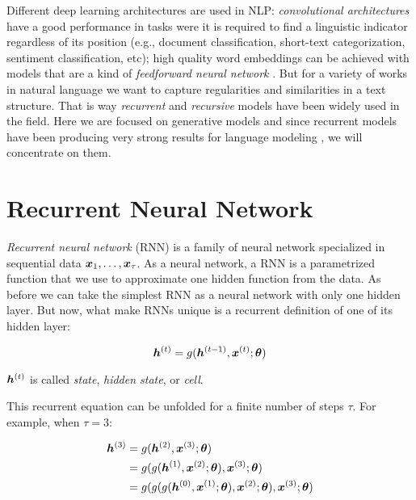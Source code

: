 Different deep learning architectures are used in NLP: \textit{convolutional architectures} have a good performance in tasks were it is required to find a linguistic indicator regardless of its position (e.g., document classification, short-text categorization, sentiment classification, etc); high quality word embeddings can be achieved with models that are a kind of \textit{feedforward neural network} \cite{Mikolov23}. But for a variety of works in natural language we want to capture regularities and similarities in a text structure. That is way \textit{recurrent} and \textit{recursive} models have been widely used in the field. Here we are focused on generative models and since recurrent models have been producing very strong results for language modeling \cite{goldberg15}, we will concentrate on them.

\section{Recurrent Neural Network}
\label{sec:RNN}


\textit{Recurrent neural network} (RNN) is a family of neural network specialized in sequential data $\bm{x}_1, \dots, \bm{x}_\tau$. As a neural network, a RNN is a parametrized function that we use to approximate one hidden function from the data. As before we can take the simplest RNN as a neural network with only one hidden layer. But now, what make RNNs unique is a recurrent definition of one of its hidden layer:

\begin{equation}
\bm{h}^{(t)} = g(\bm{h}^{(t-1)}, \bm{x}^{(t)}; \bm{\theta})
\end{equation}

$\bm{h}^{(t)}$ is called \textit{state}, \textit{hidden state}, or \textit{cell}.


\par This recurrent equation can be unfolded for a finite number of steps $\tau$. For example, when $\tau =3$:
\vspace{0.2cm}

\begin{align}
\bm{h}^{(3)}& = g(\bm{h}^{(2)}, \bm{x}^{(3)}; \bm{\theta})\\
 & = g(g(\bm{h}^{(1)}, \bm{x}^{(2)}; \bm{\theta}), \bm{x}^{(3)}; \bm{\theta})\\
 & = g(g(g(\bm{h}^{(0)}, \bm{x}^{(1)}; \bm{\theta}), \bm{x}^{(2)}; \bm{\theta}), \bm{x}^{(3)}; \bm{\theta})\\
\end{align}

